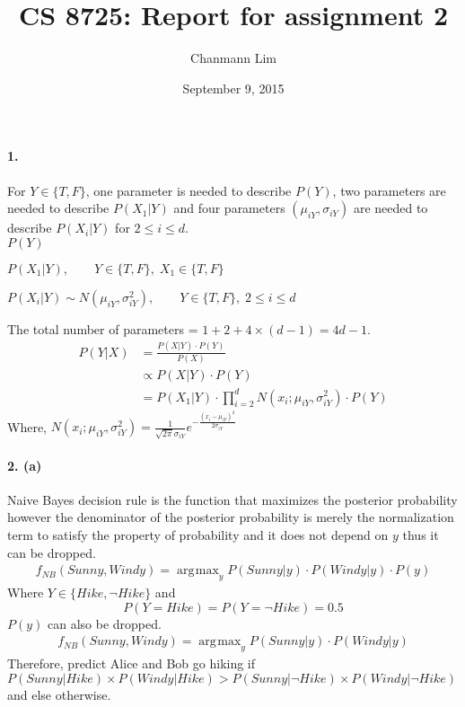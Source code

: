 \documentclass[a4paper]{article}
\DeclareMathOperator*{\argmax}{\arg\!\max}
\begin{document}
\title{CS 8725: Report for assignment 2}
\author{Chanmann Lim}
\date{September 9, 2015}
\maketitle

\paragraph{1.} For $Y \in \{T, F\}$, one parameter is needed to describe $P(Y)$, two parameters are needed to describe $P(X_1|Y)$ and four parameters $(\mu_{iY}, \sigma_{iY})$ are needed to describe $P(X_i|Y)$ for $2 \leq i \leq d$.\\

	$ P(Y) $
	
	$ P(X_1|Y), \qquad Y \in \{T, F\}, \; X_1 \in \{T, F\} $
	
	$ P(X_i|Y) \sim N(\mu_{iY}, \sigma_{iY}^2), \qquad Y \in \{T, F\}, \; 2 \leq i \leq d $
	
	The total number of parameters = $1 + 2 + 4 \times (d-1) = 4d - 1 $.	
	\begin{align}
		P(Y|X) &= \frac{P(X|Y) \cdot P(Y)}{P(X)} \\
			&\propto P(X|Y) \cdot P(Y) \\
			&= P(X_1|Y) \cdot \prod_{i=2}^d N(x_i; \mu_{iY}, \sigma_{iY}^2) \cdot P(Y)
	\end{align}
	Where, $N(x_i; \mu_{iY}, \sigma_{iY}^2) = \frac{1}{\sqrt{2\pi}\sigma_{iY}}e^{-\frac{(x_i-\mu_{iY})^2}{2\sigma_{iY}}}$

\paragraph{2. (a)} Naive Bayes decision rule is the function that maximizes the posterior probability however the denominator of the posterior probability is merely the normalization term to satisfy the property of probability and it does not depend on $y$ thus it can be dropped.\\
	\begin{align}
		f_{NB}(Sunny, Windy) = \argmax_{y} P(Sunny|y) \cdot P(Windy|y) \cdot P(y)
	\end{align}
	Where $Y \in \{Hike, \neg Hike\}$ and 
	$$ P(Y = Hike) = P(Y = \neg Hike) = 0.5 $$
	$P(y)$ can also be dropped.
	\begin{align}
		f_{NB}(Sunny, Windy) = \argmax_{y} P(Sunny|y) \cdot P(Windy|y)
	\end{align}
	Therefore, predict Alice and Bob go hiking if $P(Sunny|Hike) \times P(Windy|Hike) > P(Sunny|\neg Hike) \times P(Windy|\neg Hike)$ and else otherwise.
	
\end{document}
